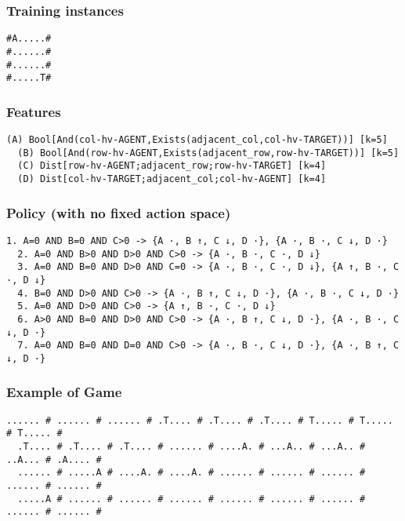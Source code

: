 \documentclass[a4paper]{article}
\begin{document}
\subsubsection{Training instances}
\begin{Verbatim}[fontsize=\footnotesize]
#A.....#
#......#
#......#
#.....T#
\end{Verbatim}

\subsubsection{Features}
\begin{Verbatim}[fontsize=\footnotesize]
  (A) Bool[And(col-hv-AGENT,Exists(adjacent_col,col-hv-TARGET))] [k=5]
  (B) Bool[And(row-hv-AGENT,Exists(adjacent_row,row-hv-TARGET))] [k=5]
  (C) Dist[row-hv-AGENT;adjacent_row;row-hv-TARGET] [k=4]
  (D) Dist[col-hv-TARGET;adjacent_col;col-hv-AGENT] [k=4]
\end{Verbatim}

\subsubsection{Policy (with no fixed action space)}
\begin{Verbatim}[fontsize=\footnotesize]
  1. A=0 AND B=0 AND C>0 -> {A ·, B ↑, C ↓, D ·}, {A ·, B ·, C ↓, D ·}
  2. A=0 AND B>0 AND D>0 AND C>0 -> {A ·, B ·, C ·, D ↓}
  3. A=0 AND B=0 AND D>0 AND C=0 -> {A ·, B ·, C ·, D ↓}, {A ↑, B ·, C ·, D ↓}
  4. B=0 AND D>0 AND C>0 -> {A ·, B ↑, C ↓, D ·}, {A ·, B ·, C ↓, D ·}
  5. A=0 AND D>0 AND C>0 -> {A ↑, B ·, C ·, D ↓}
  6. A>0 AND B=0 AND D>0 AND C>0 -> {A ·, B ↑, C ↓, D ·}, {A ·, B ·, C ↓, D ·}
  7. A=0 AND B=0 AND D=0 AND C>0 -> {A ·, B ·, C ↓, D ·}, {A ·, B ↑, C ↓, D ·}

\end{Verbatim}

\subsubsection{Example of Game}
\begin{Verbatim}[fontsize=\footnotesize]
  ...... # ...... # ...... # .T.... # .T.... # .T.... # T..... # T..... # T..... #
  .T.... # .T.... # .T.... # ...... # ....A. # ...A.. # ...A.. # ..A... # .A.... #
  ...... # .....A # ....A. # ....A. # ...... # ...... # ...... # ...... # ...... #
  .....A # ...... # ...... # ...... # ...... # ...... # ...... # ...... # ...... #
\end{Verbatim}
\end{document}
